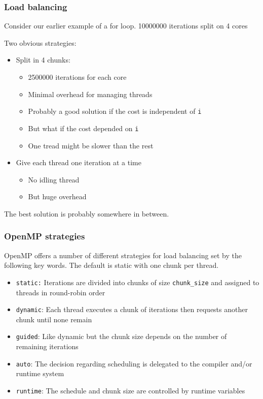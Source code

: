 \subsubsection{Load balancing}\label{load-balancing}

Consider our earlier example of a for loop. 10000000 iterations split on
4 cores

Two obvious strategies:

\begin{itemize}
\itemsep1pt\parskip0pt
\item
  Split in 4 chunks:

  \begin{itemize}
  \itemsep1pt\parskip0pt
  \item
    2500000 iterations for each core
  \item
    Minimal overhead for managing threads
  \item
    Probably a good solution if the cost is independent of \texttt{i}
  \item
    But what if the cost depended on \texttt{i}
  \item
    One tread might be slower than the rest
  \end{itemize}
\item
  Give each thread one iteration at a time

  \begin{itemize}
  \itemsep1pt\parskip0pt
  \item
    No idling thread
  \item
    But huge overhead
  \end{itemize}
\end{itemize}

The best solution is probably somewhere in between.

\subsubsection{OpenMP strategies}\label{openmp-strategies}

OpenMP offers a number of different strategies for load balancing set by
the following key words. The default is static with one chunk per
thread.

\begin{itemize}
\itemsep1pt\parskip0pt
\item
  \texttt{static:} Iterations are divided into chunks of size
  \texttt{chunk\_size} and assigned to threads in round-robin order
\item
  \texttt{dynamic}: Each thread executes a chunk of iterations then
  requests another chunk until none remain
\item
  \texttt{guided}: Like dynamic but the chunk size depends on the number
  of remaining iterations
\item
  \texttt{auto}: The decision regarding scheduling is delegated to the
  compiler and/or runtime system
\item
  \texttt{runtime}: The schedule and chunk size are controlled by
  runtime variables
\end{itemize}

